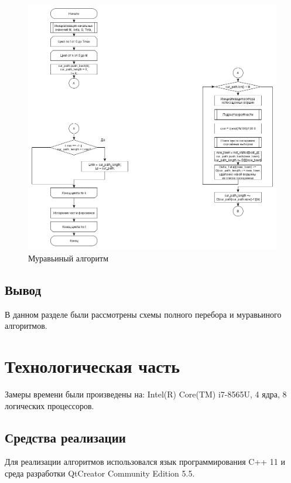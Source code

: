 \documentclass[a4paper,12pt]{report}
\begin{document}
		\begin{figure}[h!]
			\centering
			\includegraphics[width=1\linewidth]{muravei2.png}
			\caption{Муравьиный алгоритм}
			\label{ris:muravei}
		\end{figure}
	
	\section{Вывод}

			В данном разделе были рассмотрены схемы полного перебора и муравьиного алгоритмов.

    \newpage

    \chapter{Технологическая часть}
        \label{sec:tecnologic_part}

        	Замеры времени были произведены на: Intel(R) Core(TM) i7-8565U, 4 ядра, 8 логических процессоров.

	\section{Средства реализации}

			Для реализации алгоритмов использовался язык программирования C++ 11 и среда разработки QtCreator Community Edition 5.5.
			 
\end{document}
